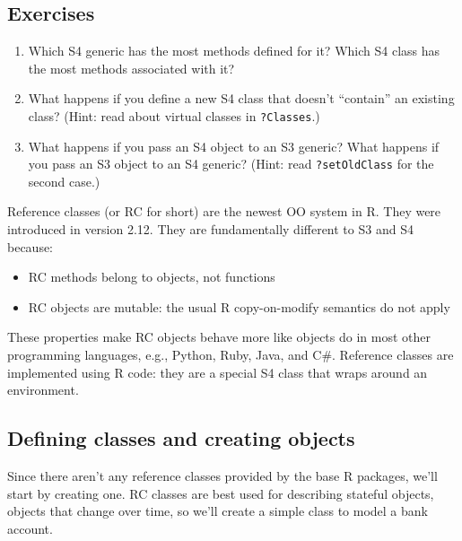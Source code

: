 \subsection{Exercises}

\begin{enumerate}
\def\labelenumi{\arabic{enumi}.}
\item
  Which S4 generic has the most methods defined for it? Which S4 class
  has the most methods associated with it?
\item
  What happens if you define a new S4 class that doesn't ``contain'' an
  existing class? (Hint: read about virtual classes in
  \texttt{?Classes}.)
\item
  What happens if you pass an S4 object to an S3 generic? What happens
  if you pass an S3 object to an S4 generic? (Hint: read
  \texttt{?setOldClass} for the second case.)
\end{enumerate}


Reference classes (or RC for short) are the newest OO system in R. They
were introduced in version 2.12. They are fundamentally different to S3
and S4 because:  

\begin{itemize}
\item
  RC methods belong to objects, not functions
\item
  RC objects are mutable: the usual R copy-on-modify semantics do not
  apply
\end{itemize}

These properties make RC objects behave more like objects do in most
other programming languages, e.g., Python, Ruby, Java, and C\#.
Reference classes are implemented using R code: they are a special S4
class that wraps around an environment.

\subsection{Defining classes and creating objects}

Since there aren't any reference classes provided by the base R
packages, we'll start by creating one. RC classes are best used for
describing stateful objects, objects that change over time, so we'll
create a simple class to model a bank account. 

